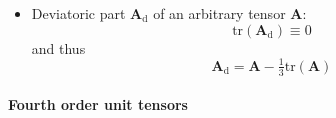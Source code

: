 \documentclass[namecite, fleqn]{goose-article}
\begin{document}
\begin{itemize}

    \item Deviatoric part $\bm{A}_\mathrm{d}$ of an arbitrary tensor $\bm{A}$:
    \begin{equation}
        \mathrm{tr}\left( \bm{A}_\mathrm{d} \right) \equiv 0
    \end{equation}
    and thus
    \begin{equation}
        \bm{A}_\mathrm{d} = \bm{A} - \tfrac{1}{3} \mathrm{tr}\left( \bm{A} \right)
    \end{equation}

\end{itemize}

\paragraph{Fourth order unit tensors}
\vspace*{.5eM}
\end{document}
